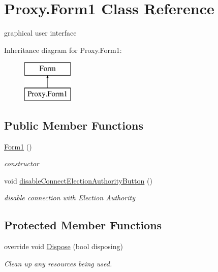 \hypertarget{class_proxy_1_1_form1}{}\section{Proxy.\+Form1 Class Reference}
\label{class_proxy_1_1_form1}


graphical user interface  


Inheritance diagram for Proxy.\+Form1\+:\begin{figure}[H]
\begin{center}
\leavevmode
\includegraphics[height=2.000000cm]{class_proxy_1_1_form1}
\end{center}
\end{figure}
\subsection*{Public Member Functions}
\begin{DoxyCompactItemize}
\item 
\hyperlink{class_proxy_1_1_form1_a3b416e1ea6edf17416d0a4b1de350f91}{Form1} ()
\begin{DoxyCompactList}\small\item\em constructor \end{DoxyCompactList}\item 
void \hyperlink{class_proxy_1_1_form1_aa4eac396d43e45368f6a89379498efb6}{disable\+Connect\+Election\+Authority\+Button} ()
\begin{DoxyCompactList}\small\item\em disable connection with Election Authority \end{DoxyCompactList}\end{DoxyCompactItemize}
\subsection*{Protected Member Functions}
\begin{DoxyCompactItemize}
\item 
override void \hyperlink{class_proxy_1_1_form1_a37412c745d716eac368b0f6c75d66efb}{Dispose} (bool disposing)
\begin{DoxyCompactList}\small\item\em Clean up any resources being used. \end{DoxyCompactList}\end{DoxyCompactItemize}


